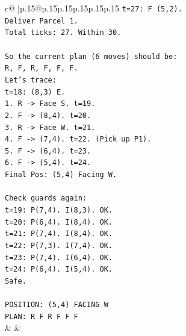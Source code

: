 \documentclass{article}
\begin{document}
{\begin{supertabular}{c@{$\;$}|p{.15\linewidth}@{}p{.15\linewidth}p{.15\linewidth}p{.15\linewidth}p{.15\linewidth}p{.15\linewidth}}
{{{\texttt{t=27: F (5,2).} \\
\texttt{Deliver Parcel 1.} \\
\texttt{Total ticks: 27. Within 30.} \\
\\ 
\texttt{So the current plan (6 moves) should be:} \\
\texttt{R, F, R, F, F, F.} \\
\texttt{Let's trace:} \\
\texttt{t=18: (8,3) E.} \\
\texttt{1. R {-}> Face S. t=19.} \\
\texttt{2. F {-}> (8,4). t=20.} \\
\texttt{3. R {-}> Face W. t=21.} \\
\texttt{4. F {-}> (7,4). t=22. (Pick up P1).} \\
\texttt{5. F {-}> (6,4). t=23.} \\
\texttt{6. F {-}> (5,4). t=24.} \\
\texttt{Final Pos: (5,4) Facing W.} \\
\\ 
\texttt{Check guards again:} \\
\texttt{t=19: P(7,4). I(8,3). OK.} \\
\texttt{t=20: P(6,4). I(8,4). OK.} \\
\texttt{t=21: P(7,4). I(8,4). OK.} \\
\texttt{t=22: P(7,3). I(7,4). OK.} \\
\texttt{t=23: P(7,4). I(6,4). OK.} \\
\texttt{t=24: P(6,4). I(5,4). OK.} \\
\texttt{Safe.} \\
\\ 
\texttt{POSITION: (5,4) FACING W} \\
\texttt{PLAN: R F R F F F} \\
            }
        }
    }
    & & \\ \\


\end{supertabular}}
\end{document}
